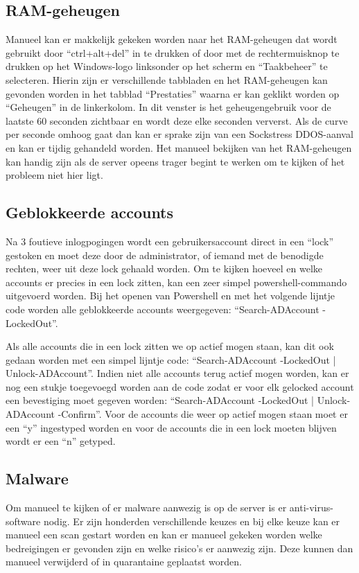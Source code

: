 \documentclass[pdftex,a4paper,12pt]{report}
\begin{document}
\subsection{RAM-geheugen}
Manueel kan er makkelijk gekeken worden naar het RAM-geheugen dat wordt gebruikt door "`ctrl+alt+del"' in te drukken of door met de rechtermuisknop te drukken op het Windows-logo linksonder op het scherm en "`Taakbeheer"' te selecteren. Hierin zijn er verschillende tabbladen en het RAM-geheugen kan gevonden worden in het tabblad "`Prestaties"' waarna er kan geklikt worden op "`Geheugen"' in de linkerkolom. In dit venster is het geheugengebruik voor de laatste 60 seconden zichtbaar en wordt deze elke seconden ververst. Als de curve per seconde omhoog gaat dan kan er sprake zijn van een Sockstress DDOS-aanval en kan er tijdig gehandeld worden. Het manueel bekijken van het RAM-geheugen kan handig zijn als de server opeens trager begint te werken om te kijken of het probleem niet hier ligt.

\subsection{Geblokkeerde accounts}
Na 3 foutieve inlogpogingen wordt een gebruikersaccount direct in een "`lock"' gestoken en moet deze door de administrator, of iemand met de benodigde rechten, weer uit deze lock gehaald worden. Om te kijken hoeveel en welke accounts er precies in een lock zitten, kan een zeer simpel powershell-commando uitgevoerd worden. Bij het openen van Powershell en met het volgende lijntje code worden alle geblokkeerde accounts weergegeven: "`Search-ADAccount -LockedOut"'. \newline 

Als alle accounts die in een lock zitten we op actief mogen staan, kan dit ook gedaan worden met een simpel lijntje code: "`Search-ADAccount -LockedOut | Unlock-ADAccount"'. Indien niet alle accounts terug actief mogen worden, kan er nog een stukje toegevoegd worden aan de code zodat er voor elk gelocked account een bevestiging moet gegeven worden: "`Search-ADAccount -LockedOut | Unlock-ADAccount -Confirm"'. Voor de accounts die weer op actief mogen staan moet er een "`y"' ingestyped worden en voor de accounts die in een lock moeten blijven wordt er een "`n"' getyped.

\subsection{Malware}
Om manueel te kijken of er malware aanwezig is op de server is er anti-virus-software nodig. Er zijn honderden verschillende keuzes en bij elke keuze kan er manueel een scan gestart worden en kan er manueel gekeken worden welke bedreigingen er gevonden zijn en welke risico's er aanwezig zijn. Deze kunnen dan manueel verwijderd of in quarantaine geplaatst worden. 
\end{document}
